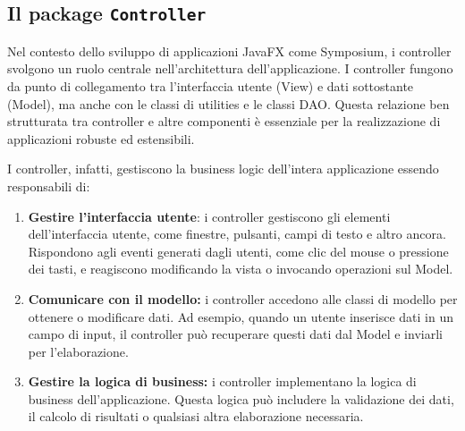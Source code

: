 \newpage
\subsection{Il package \texttt{Controller}}
Nel contesto dello sviluppo di applicazioni JavaFX come Symposium, i controller svolgono un ruolo centrale nell'architettura dell'applicazione. I controller fungono da punto di collegamento tra l'interfaccia utente (View) e dati sottostante (Model), ma anche con le classi di utilities e le classi DAO. Questa relazione ben strutturata tra controller e altre componenti è essenziale per la realizzazione di applicazioni robuste ed estensibili.
\bigskip

I controller, infatti, gestiscono la business logic dell'intera applicazione essendo responsabili di:
\begin{enumerate}
	\item \textbf{Gestire l'interfaccia utente}: i controller gestiscono gli elementi dell'interfaccia utente, come finestre, pulsanti, campi di testo e altro ancora. Rispondono agli eventi generati dagli utenti, come clic del mouse o pressione dei tasti, e reagiscono modificando la vista o invocando operazioni sul Model.
	\item \textbf{Comunicare con il modello:} i controller accedono alle classi di modello per ottenere o modificare dati. Ad esempio, quando un utente inserisce dati in un campo di input, il controller può recuperare questi dati dal Model e inviarli per l'elaborazione.
	\item \textbf{Gestire la logica di business:} i controller implementano la logica di business dell'applicazione. Questa logica può includere la validazione dei dati, il calcolo di risultati o qualsiasi altra elaborazione necessaria.
\end{enumerate}

